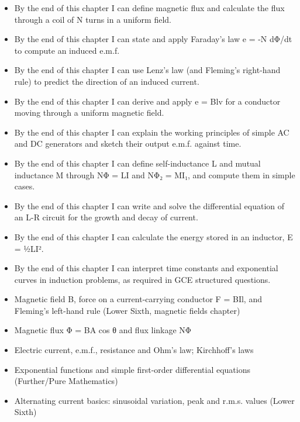 \documentclass[11pt]{article}
\begin{document}
\begin{objectifs}
\begin{itemize}
\item By the end of this chapter I can define magnetic flux and calculate the flux through a coil of N turns in a uniform field.
\item By the end of this chapter I can state and apply Faraday's law e = -N dΦ/dt to compute an induced e.m.f.
\item By the end of this chapter I can use Lenz's law (and Fleming's right-hand rule) to predict the direction of an induced current.
\item By the end of this chapter I can derive and apply e = Blv for a conductor moving through a uniform magnetic field.
\item By the end of this chapter I can explain the working principles of simple AC and DC generators and sketch their output e.m.f. against time.
\item By the end of this chapter I can define self-inductance L and mutual inductance M through NΦ = LI and NΦ₂ = MI₁, and compute them in simple cases.
\item By the end of this chapter I can write and solve the differential equation of an L-R circuit for the growth and decay of current.
\item By the end of this chapter I can calculate the energy stored in an inductor, E = ½LI².
\item By the end of this chapter I can interpret time constants and exponential curves in induction problems, as required in GCE structured questions.
\end{itemize}
\end{objectifs}

\begin{prerequis}
\begin{itemize}
\item Magnetic field B, force on a current-carrying conductor F = BIl, and Fleming's left-hand rule (Lower Sixth, magnetic fields chapter)
\item Magnetic flux Φ = BA cos θ and flux linkage NΦ
\item Electric current, e.m.f., resistance and Ohm's law; Kirchhoff's laws
\item Exponential functions and simple first-order differential equations (Further/Pure Mathematics)
\item Alternating current basics: sinusoidal variation, peak and r.m.s. values (Lower Sixth)
\end{itemize}
\end{prerequis}
\end{document}
